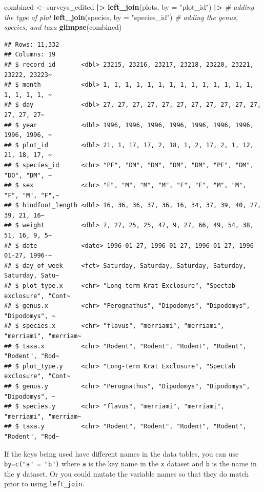 \documentclass[
  10pt,
  letterpaper,
  twoside,
  openright]{book}
\newenvironment{Shaded}{\begin{snugshade}}{\end{snugshade}}
\newcommand{\AttributeTok}[1]{\textcolor[rgb]{0.13,0.29,0.53}{#1}}
\newcommand{\CommentTok}[1]{\textcolor[rgb]{0.56,0.35,0.01}{\textit{#1}}}
\newcommand{\FunctionTok}[1]{\textcolor[rgb]{0.13,0.29,0.53}{\textbf{#1}}}
\newcommand{\NormalTok}[1]{#1}
\newcommand{\OtherTok}[1]{\textcolor[rgb]{0.56,0.35,0.01}{#1}}
\newcommand{\SpecialCharTok}[1]{\textcolor[rgb]{0.81,0.36,0.00}{\textbf{#1}}}
\newcommand{\StringTok}[1]{\textcolor[rgb]{0.31,0.60,0.02}{#1}}
\begin{document}
\begin{Shaded}
\begin{Highlighting}[]
\NormalTok{combined }\OtherTok{\textless{}{-}}\NormalTok{ surveys\_edited }\SpecialCharTok{|\textgreater{}} 
              \FunctionTok{left\_join}\NormalTok{(plots, }\AttributeTok{by =} \StringTok{"plot\_id"}\NormalTok{) }\SpecialCharTok{|\textgreater{}}  \CommentTok{\# adding the type of plot  }
              \FunctionTok{left\_join}\NormalTok{(species, }\AttributeTok{by =} \StringTok{"species\_id"}\NormalTok{) }\CommentTok{\# adding the genus, species, and taxa }
\FunctionTok{glimpse}\NormalTok{(combined)}
\end{Highlighting}
\end{Shaded}

\begin{verbatim}
## Rows: 11,332
## Columns: 19
## $ record_id       <dbl> 23215, 23216, 23217, 23218, 23220, 23221, 23222, 23223~
## $ month           <dbl> 1, 1, 1, 1, 1, 1, 1, 1, 1, 1, 1, 1, 1, 1, 1, 1, 1, 1, ~
## $ day             <dbl> 27, 27, 27, 27, 27, 27, 27, 27, 27, 27, 27, 27, 27, 27~
## $ year            <dbl> 1996, 1996, 1996, 1996, 1996, 1996, 1996, 1996, 1996, ~
## $ plot_id         <dbl> 21, 1, 17, 17, 2, 18, 1, 2, 17, 2, 1, 12, 21, 18, 17, ~
## $ species_id      <chr> "PF", "DM", "DM", "DM", "DM", "PF", "DM", "DO", "DM", ~
## $ sex             <chr> "F", "M", "M", "M", "F", "F", "M", "M", "F", "M", "F",~
## $ hindfoot_length <dbl> 16, 36, 36, 37, 36, 16, 34, 37, 39, 40, 27, 39, 21, 16~
## $ weight          <dbl> 7, 27, 25, 25, 47, 9, 27, 66, 49, 54, 38, 51, 16, 9, 5~
## $ date            <date> 1996-01-27, 1996-01-27, 1996-01-27, 1996-01-27, 1996-~
## $ day_of_week     <fct> Saturday, Saturday, Saturday, Saturday, Saturday, Satu~
## $ plot_type.x     <chr> "Long-term Krat Exclosure", "Spectab exclosure", "Cont~
## $ genus.x         <chr> "Perognathus", "Dipodomys", "Dipodomys", "Dipodomys", ~
## $ species.x       <chr> "flavus", "merriami", "merriami", "merriami", "merriam~
## $ taxa.x          <chr> "Rodent", "Rodent", "Rodent", "Rodent", "Rodent", "Rod~
## $ plot_type.y     <chr> "Long-term Krat Exclosure", "Spectab exclosure", "Cont~
## $ genus.y         <chr> "Perognathus", "Dipodomys", "Dipodomys", "Dipodomys", ~
## $ species.y       <chr> "flavus", "merriami", "merriami", "merriami", "merriam~
## $ taxa.y          <chr> "Rodent", "Rodent", "Rodent", "Rodent", "Rodent", "Rod~
\end{verbatim}

If the keys being used have different names in the data tables, you can
use \texttt{by=c("a"\ =\ "b")} where \texttt{a} is the key name in the
\texttt{x} dataset and \texttt{b} is the name in the \texttt{y} dataset.
Or you could mutate the variable names so that they do match prior to
using \texttt{left\_join}.
\end{document}
